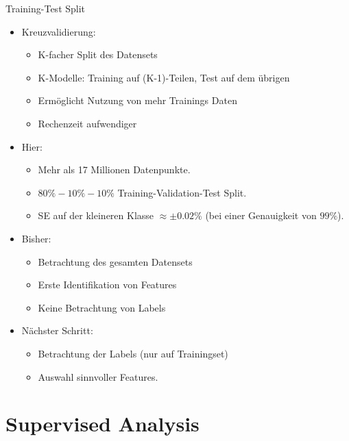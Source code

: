 \begin{frame}{Training-Test Split}

{
\begin{itemize}
\item Kreuzvalidierung:
\begin{itemize}
\item K-facher Split des Datensets
\item K-Modelle: Training auf (K-1)-Teilen, Test auf dem übrigen 
\item Ermöglicht Nutzung von mehr Trainings Daten
\item Rechenzeit aufwendiger
\end{itemize}
\item Hier:
\begin{itemize}
\item Mehr als 17 Millionen Datenpunkte.
\item $80\%-10\%-10\%$ Training-Validation-Test Split.
\item SE auf der kleineren Klasse $\approx \pm 0.02\%$ (bei einer Genauigkeit von $99\%$).
\end{itemize}
\end{itemize}
}
\end{frame}

\begin{frame}
\centering
{}
{
\begin{itemize}
\item Bisher:
\begin{itemize}
\item Betrachtung des gesamten Datensets
\item Erste Identifikation von Features
\item Keine Betrachtung von Labels
\end{itemize}
\item Nächster Schritt:
\begin{itemize}
\item Betrachtung der Labels (nur auf Trainingset)
\item Auswahl sinnvoller Features.
\end{itemize}
\end{itemize}
}
\end{frame}

\section{Supervised Analysis}

